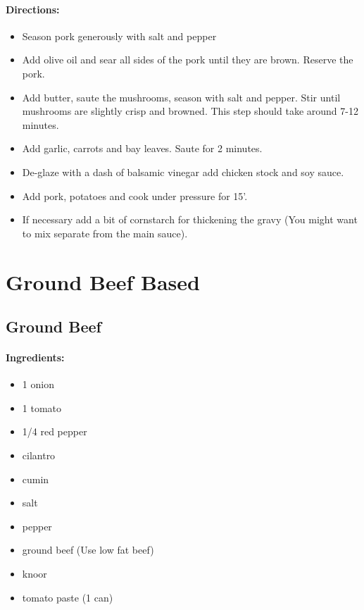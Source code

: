 \documentclass{article}
\begin{document}
\paragraph{Directions:}
\begin{itemize}
	\item Season pork generously with salt and pepper
	\item Add olive oil and sear all sides of the pork until they are brown. Reserve the pork.
	\item Add butter, saute the mushrooms, season with salt and pepper. Stir until mushrooms are slightly crisp and browned. This step should take around 7-12 minutes.
	\item Add garlic, carrots and bay leaves. Saute for 2 minutes.
	\item De-glaze with a dash of balsamic vinegar add chicken stock and soy sauce.
	\item Add pork, potatoes and cook under pressure for 15’.
	\item If necessary add a bit of cornstarch for thickening the gravy (You might want to mix separate from the main sauce).	
\end{itemize}

\section{Ground Beef Based}

\subsection{Ground Beef}

\paragraph{Ingredients:}

\begin{itemize}
	\item 1 onion 
	\item 1 tomato 
	\item 1/4 red pepper 
	\item cilantro 
	\item cumin 
	\item salt 
	\item pepper 
	\item ground beef (Use low fat beef) 
	\item knoor 
	\item tomato paste (1 can)
\end{itemize}
\end{document}
